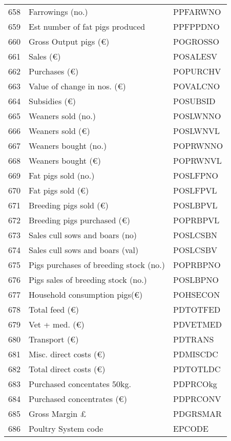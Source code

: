 \documentclass{article}\usepackage{graphicx, color}
\begin{document}
\begin{flushleft}
\begin{table}[ht]
\begin{center}
\begin{tabular}{rll}
  658 & Farrowings              (no.) & PPFARWNO \\ 
  659 & Est number of fat pigs produced & PPFPPDNO \\ 
  660 & Gross Output pigs       (€) & POGROSSO \\ 
  661 & Sales                   (€) & POSALESV \\ 
  662 & Purchases               (€) & POPURCHV \\ 
  663 & Value of change in nos. (€) & POVALCNO \\ 
  664 & Subsidies               (€) & POSUBSID \\ 
  665 & Weaners sold            (no.) & POSLWNNO \\ 
  666 & Weaners sold            (€) & POSLWNVL \\ 
  667 & Weaners bought          (no.) & POPRWNNO \\ 
  668 & Weaners bought           (€) & POPRWNVL \\ 
  669 & Fat pigs sold           (no.) & POSLFPNO \\ 
  670 & Fat pigs sold            (€) & POSLFPVL \\ 
  671 & Breeding pigs sold       (€) & POSLBPVL \\ 
  672 & Breeding pigs purchased  (€) & POPRBPVL \\ 
  673 & Sales cull sows and boars   (no) & POSLCSBN \\ 
  674 & Sales cull sows and boars   (val) & POSLCSBV \\ 
  675 & Pigs purchases of breeding stock  (no.) & POPRBPNO \\ 
  676 & Pigs sales of breeding stock  (no.) & POSLBPNO \\ 
  677 & Household consumption pigs(€) & POHSECON \\ 
  678 & Total feed              (€) & PDTOTFED \\ 
  679 & Vet + med.              (€) & PDVETMED \\ 
  680 & Transport               (€) & PDTRANS \\ 
  681 & Misc. direct costs      (€) & PDMISCDC \\ 
  682 & Total direct costs      (€) & PDTOTLDC \\ 
  683 & Purchased concentates  50kg. & PDPRCOkg \\ 
  684 & Purchased concentrates  (€) & PDPRCONV \\ 
  685 & Gross Margin            £ & PDGRSMAR \\ 
  686 & Poultry  System code & EPCODE \\ 

\end{tabular}
\end{center}
\end{table}
\end{flushleft}
\end{document}
